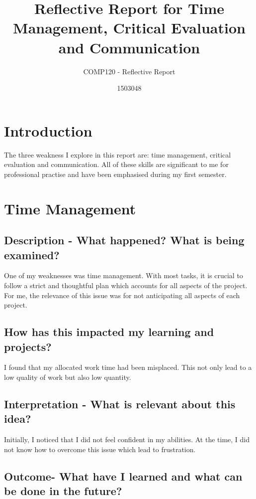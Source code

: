 \documentclass{scrartcl}
\title{Reflective Report for Time Management, Critical Evaluation and Communication}
\subtitle{COMP120 - Reflective Report}
\author{1503048}
\begin{document}
\maketitle


\section{Introduction}

The three weakness I explore in this report are: time management, critical evaluation and communication. All of these skills are significant to me for professional practise and have been emphasised during my first semester.

\section{Time Management}

\subsection{Description - What happened? What is being examined?}

One of my weaknesses was time management. With most tasks, it is crucial to follow a strict and thoughtful plan which accounts for all aspects of the project. For me, the relevance of this issue was for not anticipating all aspects of each project.

\subsection{How has this impacted my learning and projects?}

I found that my allocated work time had been misplaced. This not only lead to a low quality of work but also low quantity.

\subsection{Interpretation - What is relevant about this idea?}

Initially, I noticed that I did not feel confident in my abilities. At the time, I did not know how to overcome this issue which lead to frustration.

\subsection{Outcome- What have I learned and what can be done in the future?}
\end{document}
